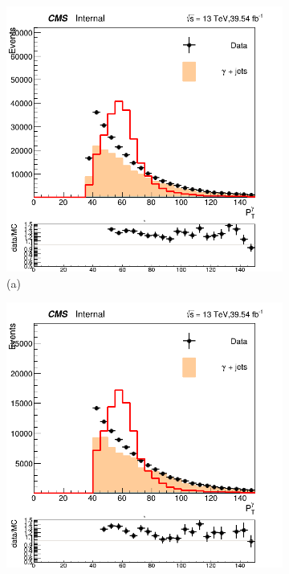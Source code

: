 \begin{figure}[!ht]
    \captionsetup[subfigure]{labelformat=empty}
    \vspace*{-0.2cm}
    \centering
    \setlength{\mylength}{\textwidth}
    \begin{subfigure}[t]{0.50\mylength}
        \centering
        \includegraphics[width=0.45\mylength]{resources/plots/Phi3_photon_pt.png}
        \caption{\footnotesize (a)}
    \end{subfigure}%
    \begin{subfigure}[t]{0.50\mylength}
        \centering
        \includegraphics[width=0.45\mylength]{resources/plots/Omega_photon_pt.png}

\end{subfigure}
\end{figure}
